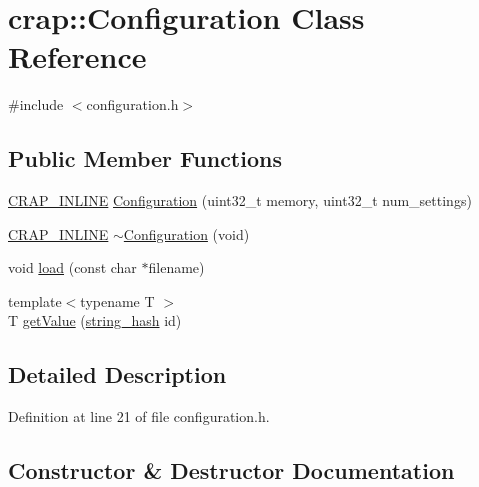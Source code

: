 \hypertarget{classcrap_1_1_configuration}{}\section{crap\+:\+:Configuration Class Reference}
\label{classcrap_1_1_configuration}


{\ttfamily \#include $<$configuration.\+h$>$}

\subsection*{Public Member Functions}
\begin{DoxyCompactItemize}
\item 
\hyperlink{config__x86_8h_a5a40526b8d842e7ff731509998bb0f1c}{C\+R\+A\+P\+\_\+\+I\+N\+L\+I\+N\+E} \hyperlink{classcrap_1_1_configuration_ae4d55c44ced64675a8d628309412fd4d}{Configuration} (uint32\+\_\+t memory, uint32\+\_\+t num\+\_\+settings)
\item 
\hyperlink{config__x86_8h_a5a40526b8d842e7ff731509998bb0f1c}{C\+R\+A\+P\+\_\+\+I\+N\+L\+I\+N\+E} \hyperlink{classcrap_1_1_configuration_a26af296814f58eef2bd518d60faae1ba}{$\sim$\+Configuration} (void)
\item 
void \hyperlink{classcrap_1_1_configuration_a279b4f6136af08abb47bbd803cf1cce8}{load} (const char $\ast$filename)
\item 
{\footnotesize template$<$typename T $>$ }\\T \hyperlink{classcrap_1_1_configuration_a427c9acd9a6e1b99dc647cc56c48ac40}{get\+Value} (\hyperlink{classcrap_1_1string__hash}{string\+\_\+hash} id)
\end{DoxyCompactItemize}


\subsection{Detailed Description}


Definition at line 21 of file configuration.\+h.



\subsection{Constructor \& Destructor Documentation}
\hypertarget{classcrap_1_1_configuration_ae4d55c44ced64675a8d628309412fd4d}{}

